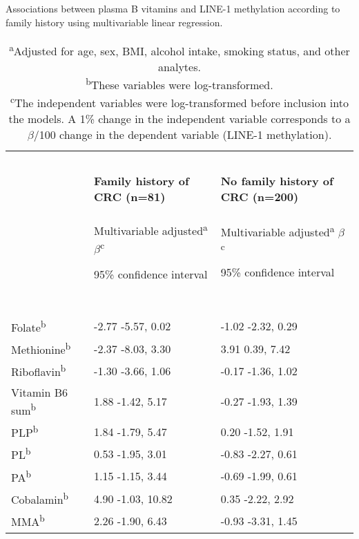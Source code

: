 \begin{table}
\small
\caption{Associations between plasma B vitamins and LINE-1 methylation according to family history using multivariable linear regression.}
\label{table5_3}
\begin{adjustbox}{width=\textwidth}
\begin{tabular}{L{2.5cm}C{5.0cm}C{5.0cm}}

\hline
~ & ~ & ~\\
 ~ & \bfseries Family history of CRC (n=81) & %
\bfseries No family history of CRC (n=200)\\
~ & { Multivariable adjusted\textsuperscript{a}} { $\beta $\textsuperscript{c}}

95\% confidence interval & { Multivariable adjusted\textsuperscript{a}} { $\beta $\textsuperscript{c}}

95\% confidence interval
\\
~ & ~ & ~\\
\hline
Folate\textsuperscript{b} & { {}-2.77} {}-5.57, 0.02 & { {}-1.02} {}-2.32, 0.29\\
Methionine\textsuperscript{b} & { {}-2.37} {}-8.03, 3.30 & { 3.91} 0.39, 7.42\\
Riboflavin\textsuperscript{b} & { {}-1.30} {}-3.66, 1.06 & { {}-0.17} {}-1.36, 1.02\\
Vitamin B6 sum\textsuperscript{b} & { 1.88} {}-1.42, 5.17 & { {}-0.27} {}-1.93, 1.39\\
PLP\textsuperscript{b} & { 1.84} {}-1.79, 5.47 & { 0.20} {}-1.52, 1.91\\
PL\textsuperscript{b} & { 0.53} {}-1.95, 3.01 & { {}-0.83} {}-2.27, 0.61\\
PA\textsuperscript{b} & { 1.15} {}-1.15, 3.44 & { {}-0.69} {}-1.99, 0.61\\
Cobalamin\textsuperscript{b} & { 4.90} {}-1.03, 10.82 & { 0.35} {}-2.22, 2.92\\
MMA\textsuperscript{b} & { 2.26} {}-1.90, 6.43 & { {}-0.93} {}-3.31, 1.45\\
\hline
\end{tabular}
\end{adjustbox}
\caption*{\footnotesize{\textsuperscript{a}Adjusted for age, sex, BMI, alcohol intake, smoking status, and other analytes.\\\textsuperscript{b}These variables were log-transformed.\\\textsuperscript{c}The independent variables were log-transformed before inclusion into the models. A 1\% change in the independent variable corresponds to a $\beta$/100 change in the dependent variable (LINE-1 methylation).}}
\end{table}

